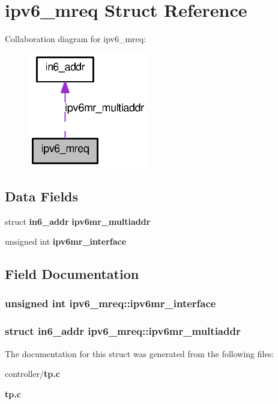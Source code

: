 \section{ipv6\_\-mreq Struct Reference}
\label{structipv6__mreq}


Collaboration diagram for ipv6\_\-mreq:
\nopagebreak
\begin{figure}[H]
\begin{center}
\leavevmode
\includegraphics[width=148pt]{structipv6__mreq__coll__graph}
\end{center}
\end{figure}
\subsection*{Data Fields}
\begin{DoxyCompactItemize}
\item 
struct {\bf in6\_\-addr} {\bf ipv6mr\_\-multiaddr}
\item 
unsigned int {\bf ipv6mr\_\-interface}
\end{DoxyCompactItemize}


\subsection{Field Documentation}
\subsubsection[{ipv6mr\_\-interface}]{\setlength{\rightskip}{0pt plus 5cm}unsigned int {\bf ipv6\_\-mreq::ipv6mr\_\-interface}}\label{structipv6__mreq_a51b0a3b917110bef413999eecea678cb}
\subsubsection[{ipv6mr\_\-multiaddr}]{\setlength{\rightskip}{0pt plus 5cm}struct {\bf in6\_\-addr} {\bf ipv6\_\-mreq::ipv6mr\_\-multiaddr}}\label{structipv6__mreq_a11adc73ca35eb4c46bf443ecc15d4715}


The documentation for this struct was generated from the following files:\begin{DoxyCompactItemize}
\item 
controller/{\bf tp.c}\item 
{\bf tp.c}\end{DoxyCompactItemize}
